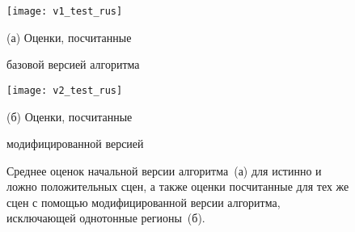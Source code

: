 \begin{figure}[!h]
	\begin{minipage}[b]{0.49\linewidth}
		\centering
		\centerline{ \texttt{[image: v1\_test\_rus]} }
		\centerline{(а) Оценки, посчитанные}
		\centerline{базовой версией алгоритма}\medskip
	\end{minipage}
	\hfill
	\begin{minipage}[b]{0.49\linewidth}
		\centering
		\centerline{\texttt{[image: v2\_test\_rus]} }
		\centerline{(б) Оценки, посчитанные}
		\centerline{модифицированной версией}\medskip
	\end{minipage}
    \caption{Среднее оценок начальной версии алгоритма~(а) для истинно и ложно
    	положительных сцен, а также оценки посчитанные для тех же сцен с помощью
    	модифицированной версии алгоритма, исключающей однотонные регионы~(б).}
	\label{fig:textureless}
\end{figure}
